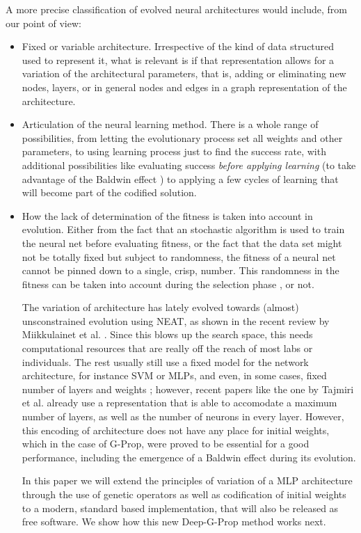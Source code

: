 \documentclass[runningheads]{llncs}
\begin{document}
A more precise classification of evolved neural architectures would include, from our point of
view: \begin{itemize}
  \item Fixed or variable architecture. Irrespective of the kind of
    data structured used to represent it, what is relevant is if that
    representation allows for a variation of the architectural
    parameters, that is, adding or eliminating new nodes, layers, or
    in general nodes and edges in a graph representation of the
    architecture.
  \item Articulation of the neural learning method. There is a whole
    range of possibilities, from letting the evolutionary process set
    all weights and other parameters, to using learning process just
    to find the success rate, with additional possibilities like
    evaluating success {\em before applying learning} (to take
    advantage of the Baldwin effect \cite{baldwin-AEB02}) to applying
    a few cycles of learning that will become part of the codified
    solution.
  \item How the lack of determination of the fitness is taken into account 
    in evolution. Either from the fact that an stochastic algorithm is
    used to train the neural net before evaluating fitness, or the
    fact that the data set might not be totally fixed but subject to
    randomness, the fitness of a neural net cannot be pinned down to a
    single, crisp, number. This randomness in the fitness can be taken
    into account during the selection phase
    \cite{DBLP:conf/ijcci/MereloLFGCCRMG15}, or not.
    

The variation of architecture has lately evolved towards (almost)
unsconstrained evolution using NEAT, as shown in the recent review by
Miikkulainet et al. \cite{miikkulainen2019evolving}. Since this blows
up the search space, this needs computational resources that are
really off the reach of most labs or individuals. The rest usually
still use a fixed model for the network architecture, for instance SVM
or MLPs, and even, in some cases, fixed number of layers and weights
\cite{ecer2020training}; however, recent papers like the one by
Tajmiri et al. \cite{TAJMIRI2020108997} already use a representation
that is able to accomodate a maximum number of layers, as well as the
number of neurons in every layer. However, this encoding of
architecture does not have any place for initial weights, which in the
case of G-Prop, were proved to be essential for a good performance,
including the emergence of a Baldwin effect \cite{castillo-2006}
during its evolution.

In this paper we will extend the principles of variation of a MLP
architecture through the use of genetic operators as well as
codification of initial weights to a modern, standard based
implementation, that will also be released as free software. We show
how this new Deep-G-Prop method works next.

\end{itemize}
\end{document}
